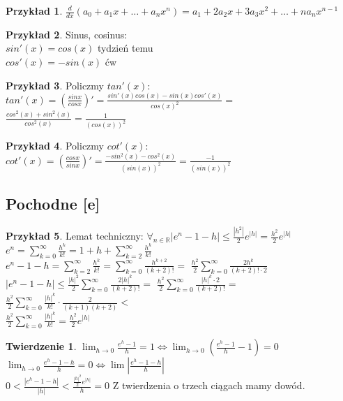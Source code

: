 \documentclass{article}
\theoremstyle{definition}
\theoremstyle{definition}
\newtheorem{tw}{Twierdzenie}[subsection]
\theoremstyle{definition}
\newtheorem{pk}{Przykład}[subsection]
\theoremstyle{definition}
\begin{document}
\begin{pk}
    $\frac{d}{dx} \left(a_0 + a_1 x + \dots + a_n x^n\right)=a_1 + 2a_2 x + 3a_3 x^2 + \dots + n a_n x^{n-1}$
\end{pk}

\begin{pk}
    Sinus, cosinus:\\
    $sin'(x)=cos(x)$ tydzień temu\\
    $cos'(x)=-sin(x)$ ćw\\
\end{pk}

\begin{pk}
    Policzmy $tan'(x)$:\\
    $tan'(x)=(\frac{sinx}{cosx})'=\frac{sin'(x)cos(x)-sin(x)cos'(x)}{cos(x)^2}=$
    $\frac{cos^2(x)+sin^2(x)}{cos^2(x)}=\frac{1}{(cos(x))^2}$
\end{pk}

\begin{pk}
    Policzmy $cot'(x)$:\\
    $cot'(x)=(\frac{cosx}{sinx})'=\frac{-sin^2(x)-cos^2(x)}{\left(sin(x)\right)^2}=\frac{-1}{\left(sin(x)\right)^2}$
\end{pk}

\subsection{Pochodne [e]}

\begin{pk}
    Lemat techniczny:
    $\forall_{n\in\mathbb{R}} |e^n-1-h| \leq \frac{|h^2|}{2}e^{|h|} = \frac{h^2}{2}e^{|h|}$\\
    $e^n=\sum_{k=0}^{\infty} \frac{h^k}{k!}= 1+h+\sum_{k=2}^{\infty} \frac{h^k}{k!}$\\
    $e^n-1-h=\sum_{k=2}^{\infty} \frac{h^k}{k!} = \sum_{k=0}^{\infty} \frac{h^{k+2}}{(k+2)!}=$
    $\frac{h^2}{2} \sum_{k=0}^{\infty} \frac{2h^k}{(k+2)!\cdot 2}$\\
    $|e^n-1-h| \leq \frac{|h|^2}{2} \sum_{k=0}^{\infty} \frac{2|h|^k}{(k+2)!}=$
    $\frac{h^2}{2}\sum_{k=0}^{\infty} \frac{|h|^k\cdot 2}{(k+2)!}=$
    $\frac{h^2}{2}\sum_{k=0}^{\infty} \frac{|h|^k}{k!} \cdot \frac{2}{(k+1)(k+2)}<$\\
    $\frac{h^2}{2}\sum_{k=0}^{\infty} \frac{|h|^k}{k!}=\frac{h^2}{2}e^{|h|}$
\end{pk}

\begin{tw}
    $\lim_{h\rightarrow 0} \frac{e^h-1}{h}=1 \iff \lim_{h\rightarrow 0} \left(\frac{e^h-1}{h}-1\right)=0$\\
    $\lim_{h\rightarrow 0} \frac{e^h-1-h}{h}=0 \iff \lim \left|\frac{e^h - 1 -h}{h}\right|$\\
    $0<\frac{|e^h-1-h|}{|h|}<\frac{\frac{|h|^2}{2}e^{|h|}}{h}=0$
    Z twierdzenia o trzech ciągach mamy dowód.
\end{tw}
\end{document}
